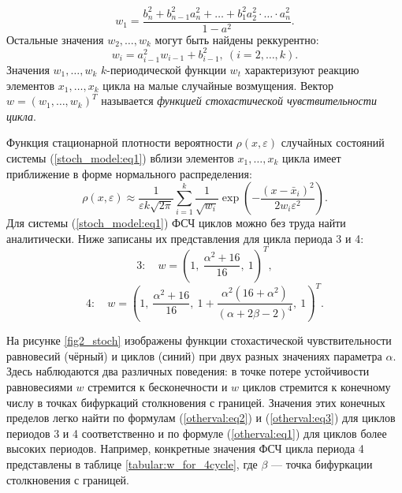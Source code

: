 \documentclass[a4paper, 14pt]{extreport}
\numberwithin{equation}{section}
\numberwithin{figure}{section}
\numberwithin{table}{section}
\begin{document}
				\begin{equation}
                \label{w1cycle:eq1}
					w_{1} = \frac{b^{2}_{n} + b^{2}_{n - 1} a^{2}_{n} + \ldots + b^{2}_{1} a^{2}_{2} \cdot \ldots \cdot a^{2}_{n}}{1 - a^{2}}.
				\end{equation}
				Остальные значения $ w_{2}, \ldots, w_{k} $ могут быть найдены реккурентно:
				\begin{equation}
				\label{otherval:eq1}
					w_{i} = a^{2}_{i - 1} w_{i - 1} + b^{2}_{i - 1},~(i = 2, \ldots, k).
				\end{equation}
				Значения $ w_{1}, \ldots, w_{k} $ $ k $-периодической функции $ w_{t} $ характеризуют реакцию элементов $ x_{1}, \ldots, x_{k} $ цикла на малые случайные возмущения. Вектор $ w = (w_{1}, \ldots, w_{k})^{T} $ называется {\it функцией стохастической чувствительности цикла}. %

				Функция стационарной плотности вероятности $ \rho(x, \varepsilon) $ случайных состояний системы (\ref{stoch_model:eq1}) вблизи элементов $ x_{1}, \ldots, x_{k} $ цикла имеет приближение в форме нормального распределения:
				\begin{equation}
				\label{rhocycle:eq1}
					\rho(x, \varepsilon) \approx \frac{1}{\varepsilon k \sqrt{2 \pi}} \sum_{i = 1}^{k} \frac{1}{\sqrt{w_{i}}} \exp{\left(-\frac{(x - \bar{x}_{i})^{2}}{2 w_{i} \varepsilon^{2}}\right)}.
				\end{equation}
				Для системы (\ref{stoch_model:eq1}) ФСЧ циклов можно без труда найти аналитически. Ниже записаны их представления для цикла периода 3 и 4:
				\begin{equation}
				\label{otherval:eq2}
					3: \quad w = \left(1,~\frac{\alpha^{2} + 16}{16},~1\right)^{T},
				\end{equation}
				\begin{equation}
				\label{otherval:eq3}
					4: \quad w = \left(1,~\frac{\alpha^{2} + 16}{16},~1+\frac{\alpha^2 \left(16+\alpha^2\right)}{(\alpha+2 \beta-2)^4},~1\right)^{T}.%
				\end{equation} %

				На рисунке \ref{fig2_stoch} изображены функции стохастической чувствительности равновесий (чёрный) и циклов (синий) при двух разных значениях параметра $ \alpha $. Здесь наблюдаются два различных поведения: в точке потере устойчивости равновесиями $ w $ стремится к бесконечности и $ w $ циклов стремится к конечному числу в точках бифуркаций столкновения с границей. Значения этих конечных пределов легко найти по формулам (\ref{otherval:eq2}) и (\ref{otherval:eq3}) для циклов периодов 3 и 4 соответственно и по формуле (\ref{otherval:eq1}) для циклов более высоких периодов. Например, конкретные значения ФСЧ цикла периода 4 представлены в таблице \ref{tabular:w_for_4cycle}, где $ \beta $ --- точка бифуркации столкновения с границей. %
\end{document}
